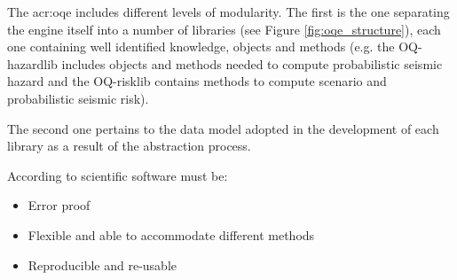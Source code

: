 The \gls{acr:oqe} includes different levels of modularity. The first is the one separating the engine itself into a number of libraries (see Figure \ref{fig:oqe_structure}), each one containing well identified knowledge, objects and methods (e.g. the OQ-hazardlib  includes objects and methods needed to compute probabilistic seismic hazard and the OQ-risklib contains methods to compute scenario and probabilistic seismic risk).

The second one pertains to the data model adopted in the development of each library as a result of the abstraction process.

According to \textcite{berkes2012} scientific software must be:
\begin{itemize}
\item Error proof
\item Flexible and able to accommodate different methods
\item Reproducible and re-usable
\end{itemize}